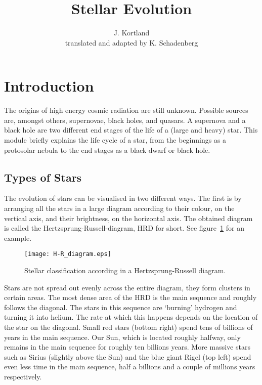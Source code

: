 



\author{J. Kortland \\ translated and adapted by K. Schadenberg}
\date{}
\title{Stellar Evolution}



\maketitle

\section{Introduction}
The origins of high energy cosmic radiation are still unknown. Possible sources are, amongst others, supernovae, black holes, and quasars. A supernova and a black hole are two different end stages of the life of a (large and heavy) star. This module briefly explains the life cycle of a star, from the beginnings as a protosolar nebula to the end stages as a black dwarf or black hole.

\subsection{Types of Stars}
The evolution of stars can be visualised in two different ways. The first is by arranging all the stars in a large diagram according to their colour, on the vertical axis, and their brightness, on the horizontal axis. The obtained diagram is called the Hertzsprung-Russell-diagram, HRD for short. See figure~\ref{fig:HRD_1} for an example.

\begin{figure}\begin{center}
\texttt{[image: H-R\_diagram.eps]}
\caption{Stellar classification according in a Hertzsprung-Russell diagram.\protect\footnotemark}\label{fig:HRD_1}
\end{center}\end{figure}

Stars are not spread out evenly across the entire diagram, they form clusters in certain areas. The most dense area of the HRD is the main sequence and roughly follows the diagonal. The stars in this sequence are `burning' hydrogen and turning it into helium. The rate at which this happens depends on the location of the star on the diagonal. Small red stars (bottom right) spend tens of billions of years in the main sequence. Our Sun, which is located roughly halfway, only remains in the main sequence for roughly ten billions years. More massive stars such as Sirius (slightly above the Sun) and the blue giant Rigel (top left) spend even less time in the main sequence, half a billions and a couple of millions years respectively.


